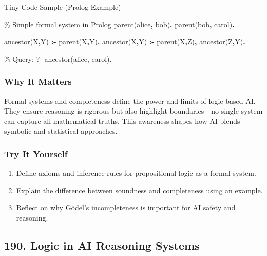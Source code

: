 \documentclass[
  letterpaper,
  DIV=11,
  numbers=noendperiod]{scrreprt}
\newenvironment{Shaded}{\begin{snugshade}}{\end{snugshade}}
\newcommand{\CommentTok}[1]{\textcolor[rgb]{0.37,0.37,0.37}{#1}}
\newcommand{\DataTypeTok}[1]{\textcolor[rgb]{0.68,0.00,0.00}{#1}}
\newcommand{\KeywordTok}[1]{\textcolor[rgb]{0.00,0.23,0.31}{\textbf{#1}}}
\newcommand{\NormalTok}[1]{\textcolor[rgb]{0.00,0.23,0.31}{#1}}
\providecommand{\tightlist}{%
  \setlength{\itemsep}{0pt}\setlength{\parskip}{0pt}}
\begin{document}
Tiny Code Sample (Prolog Example)

\begin{Shaded}
\begin{Highlighting}[]
\CommentTok{\% Simple formal system in Prolog}
\NormalTok{parent(alice}\KeywordTok{,}\NormalTok{ bob)}\KeywordTok{.}
\NormalTok{parent(bob}\KeywordTok{,}\NormalTok{ carol)}\KeywordTok{.}

\NormalTok{ancestor(}\DataTypeTok{X}\KeywordTok{,}\DataTypeTok{Y}\NormalTok{) }\KeywordTok{:{-}}\NormalTok{ parent(}\DataTypeTok{X}\KeywordTok{,}\DataTypeTok{Y}\NormalTok{)}\KeywordTok{.}
\NormalTok{ancestor(}\DataTypeTok{X}\KeywordTok{,}\DataTypeTok{Y}\NormalTok{) }\KeywordTok{:{-}}\NormalTok{ parent(}\DataTypeTok{X}\KeywordTok{,}\DataTypeTok{Z}\NormalTok{)}\KeywordTok{,}\NormalTok{ ancestor(}\DataTypeTok{Z}\KeywordTok{,}\DataTypeTok{Y}\NormalTok{)}\KeywordTok{.}

\CommentTok{\% Query: ?{-} ancestor(alice, carol).}
\end{Highlighting}
\end{Shaded}

\subsubsection{Why It Matters}\label{why-it-matters-86}

Formal systems and completeness define the power and limits of
logic-based AI. They ensure reasoning is rigorous but also highlight
boundaries---no single system can capture all mathematical truths. This
awareness shapes how AI blends symbolic and statistical approaches.

\subsubsection{Try It Yourself}\label{try-it-yourself-188}

\begin{enumerate}
\def\labelenumi{\arabic{enumi}.}
\tightlist
\item
  Define axioms and inference rules for propositional logic as a formal
  system.
\item
  Explain the difference between soundness and completeness using an
  example.
\item
  Reflect on why Gödel's incompleteness is important for AI safety and
  reasoning.
\end{enumerate}

\subsection{190. Logic in AI Reasoning
Systems}\label{logic-in-ai-reasoning-systems}
\end{document}
